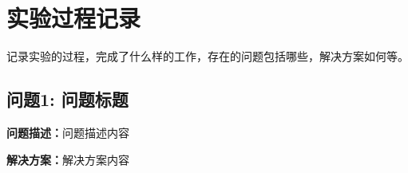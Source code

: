 \section{实验过程记录}

记录实验的过程，完成了什么样的工作，存在的问题包括哪些，解决方案如何等。

\subsection{问题1: 问题标题}
\textbf{问题描述：}问题描述内容

\textbf{解决方案：}解决方案内容
